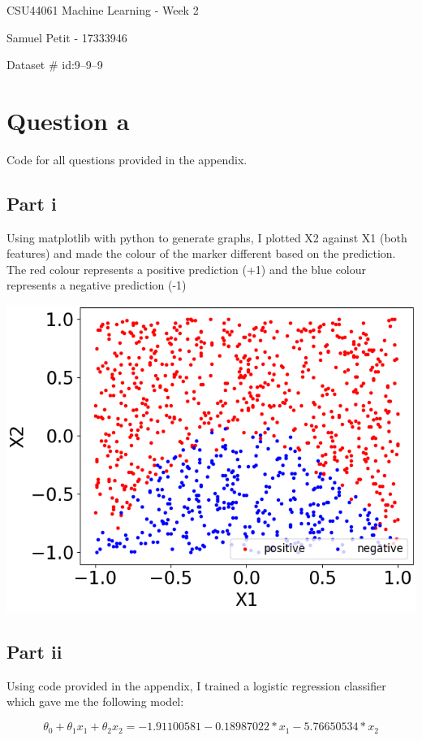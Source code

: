\documentclass[10pt]{article}
\begin{document}
{\centering
    CSU44061 Machine Learning - Week 2
    \par
    Samuel Petit - 17333946
    \par
    Dataset \# id:9--9--9 
    \par
}
\section*{Question a}
Code for all questions provided in the appendix.

\subsection*{Part i}

Using matplotlib with python to generate graphs, I plotted X2 against X1 (both features)
and made the colour of the marker different based on the prediction.
The red colour represents a positive prediction (+1) and the blue colour represents a negative
prediction (-1)

\vspace{5mm} %

\includegraphics[scale=0.35]{Figure_1.png}

\subsection*{Part ii}
Using code provided in the appendix, I trained a logistic regression
classifier which gave me the following model:

\begin{equation*}
    \theta_{0} + \theta_{1}x_{1} + \theta_{2}x_{2} = -1.91100581 - 0.18987022 * x_{1} - 5.76650534 * x_{2}
\end{equation*}
\end{document}

